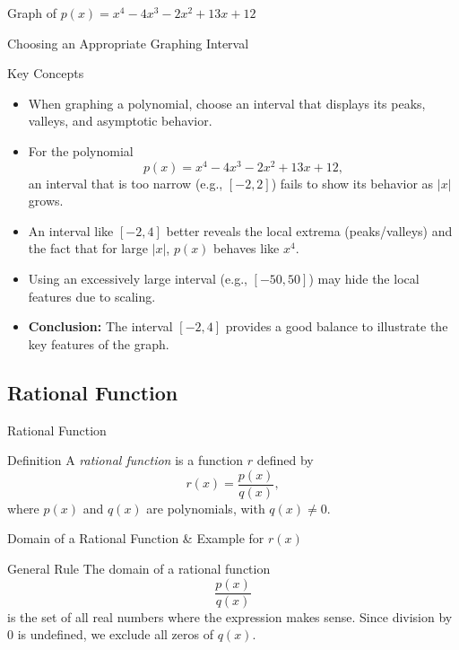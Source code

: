 \documentclass{beamer}
\begin{document}
\begin{frame}{Graph of \(p(x)=x^4-4x^3-2x^2+13x+12\)}
\end{frame}

\begin{frame}{Choosing an Appropriate Graphing Interval}
  \begin{block}{Key Concepts}
    \begin{itemize}
      \item When graphing a polynomial, choose an interval that displays its peaks, valleys, and asymptotic behavior.
      \item For the polynomial
      \[
        p(x)=x^4-4x^3-2x^2+13x+12,
      \]
      an interval that is too narrow (e.g., \([-2,2]\)) fails to show its behavior as \(|x|\) grows.
      \item An interval like \([-2,4]\) better reveals the local extrema (peaks/valleys) and the fact that for large \(|x|\), \(p(x)\) behaves like \(x^4\).
      \item Using an excessively large interval (e.g., \([-50,50]\)) may hide the local features due to scaling.
      \item \textbf{Conclusion:} The interval \([-2,4]\) provides a good balance to illustrate the key features of the graph.
    \end{itemize}
  \end{block}
\end{frame}

\subsection{Rational Function}
\begin{frame}{Rational Function}
  \begin{block}{Definition}
    A \emph{rational function} is a function \(r\) defined by
    \[
      r(x) = \frac{p(x)}{q(x)},
    \]
    where \(p(x)\) and \(q(x)\) are polynomials, with \(q(x) \neq 0\).
  \end{block}
\end{frame}

\begin{frame}{Domain of a Rational Function \& Example for \(r(x)\)}
  \begin{block}{General Rule}
    The domain of a rational function 
    \[
      \frac{p(x)}{q(x)}
    \]
    is the set of all real numbers where the expression makes sense. Since division by 0 is undefined, we exclude all zeros of \(q(x)\).
  \end{block}
\end{frame}
\end{document}
